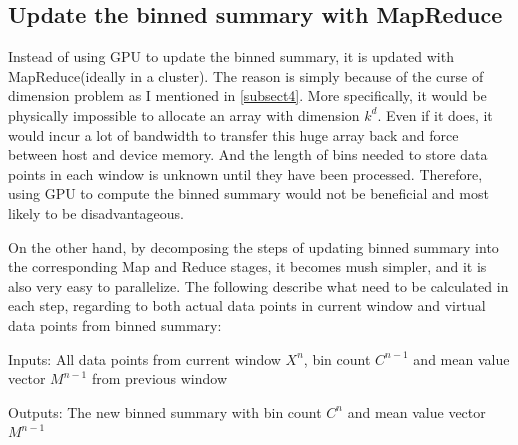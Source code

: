 \documentclass[11pt]{article}       %
\begin{document}
\subsection{Update the binned summary with MapReduce}

Instead of using GPU to update the binned summary, it is updated with MapReduce(ideally in a cluster). The reason is simply because of the curse of dimension problem as I mentioned in \ref{subsect4}. More specifically, it would be physically impossible to allocate an array with dimension $k^d$. Even if it does, it would incur a lot of bandwidth to transfer this huge array back and force between host and device memory.  And the length of bins needed to store data points in each window is unknown until they have been processed. Therefore, using GPU to compute the binned summary would not be beneficial and most likely to be disadvantageous. 

On the other hand, by decomposing the steps of updating binned summary into the corresponding Map and Reduce stages, it becomes mush simpler, and it is also very easy to parallelize. The following describe what need to be calculated in each step, regarding to both actual data points in current window and virtual data points from binned summary:

Inputs: All data points from current window $X^n$, bin count $C^{n-1}$ and mean value vector $M^{n-1}$ from previous window

Outputs: The new binned summary with bin count $C^{n}$ and mean value vector $M^{n-1}$
\end{document}

